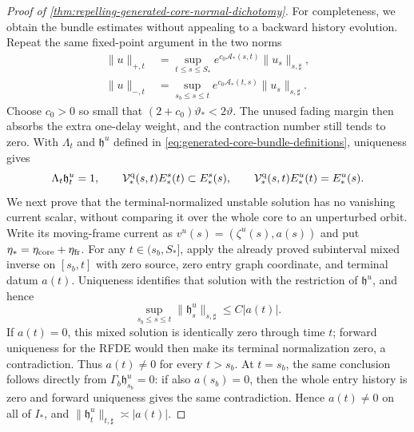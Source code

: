 \begin{proof}[Proof of
\cref{thm:repelling-generated-core-normal-dichotomy}]
For completeness, we obtain the bundle estimates without appealing to a
backward history evolution.  Repeat the same fixed-point argument in the
two norms
\begin{align*}
 \|u\|_{+,t}
 &=\sup_{t\le s\le S_*}
 e^{c_0\mathscr A_*(s,t)}\|u_s\|_{s,\sharp},\\
 \|u\|_{-,t}
 &=\sup_{s_b\le s\le t}
 e^{c_0\mathscr A_*(t,s)}\|u_s\|_{s,\sharp}.
\end{align*}
Choose \(c_0>0\) so small that
\((2+c_0)\vartheta_*<2\vartheta\).  The unused fading margin then absorbs
the extra one-delay weight, and the contraction number still tends to
zero.  With \(\Lambda_t\) and \(\mathfrak h^u\) defined in
\cref{eq:generated-core-bundle-definitions}, uniqueness gives
\[
 \Lambda_t\mathfrak h_t^u=1,\qquad
 \mathcal V_*^{\rm q}(s,t)E_*^s(t)\subset E_*^s(s),
 \qquad
 \mathcal V_*^{\rm q}(s,t)E_*^u(t)=E_*^u(s).
\]
We next prove that the terminal-normalized unstable solution has no
vanishing current scalar, without comparing it over the whole core to an
unperturbed orbit.  Write its moving-frame current as
\(v^u(s)=(\zeta^u(s),a(s))\) and put
\(\eta_*=\eta_{\rm core}+\eta_{\rm fr}\).  For any
\(t\in(s_b,S_*]\), apply the already proved subinterval mixed inverse on
\([s_b,t]\) with zero source, zero entry graph coordinate, and terminal
datum \(a(t)\).  Uniqueness identifies that solution with the restriction
of \(\mathfrak h^u\), and hence
\begin{equation}
 \sup_{s_b\le s\le t}\|\mathfrak h_s^u\|_{s,\sharp}
 \le C|a(t)|.                                  \label{eq:proof-generated-core-local-unstable-control}
\end{equation}
If \(a(t)=0\), this mixed solution is identically zero through time
\(t\); forward uniqueness for the RFDE would then make its terminal
normalization zero, a contradiction.  Thus \(a(t)\ne0\) for every
\(t>s_b\).  At \(t=s_b\), the same conclusion follows directly from
\(\Gamma_b\mathfrak h_{s_b}^u=0\): if also \(a(s_b)=0\), then the whole
entry history is zero and forward uniqueness gives the same
contradiction.  Hence \(a(t)\ne0\) on all of \(I_*\), and
\(\|\mathfrak h_t^u\|_{t,\sharp}\asymp|a(t)|\).


\end{proof}

